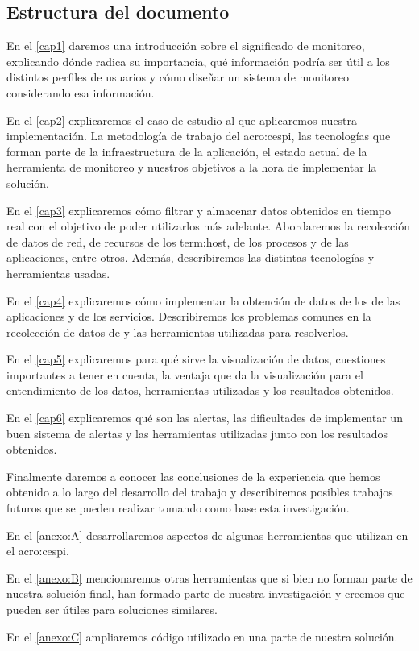 \subsection{Estructura del documento}
\label{estructura}

En el \autoref{cap1} daremos una introducción sobre el significado de
monitoreo, explicando dónde radica su importancia, qué información podría ser
útil a los distintos perfiles de usuarios y cómo diseñar un sistema de
monitoreo considerando esa información.

En el \autoref{cap2} explicaremos el caso de estudio al que aplicaremos nuestra
implementación. La metodología de trabajo del \gls{acro:cespi}, las tecnologías que
forman parte de la infraestructura de la aplicación, el estado actual de la
herramienta de monitoreo y nuestros objetivos a la hora de implementar la
solución.

En el \autoref{cap3} explicaremos cómo filtrar y almacenar datos obtenidos en
tiempo real con el objetivo de poder utilizarlos más adelante. Abordaremos la
recolección de datos de red, de recursos de los \gls{term:host}, de los
procesos y de las aplicaciones, entre otros. Además, describiremos las
distintas tecnologías y herramientas usadas.

En el \autoref{cap4} explicaremos cómo implementar la obtención de datos de los
 de las aplicaciones y de los servicios. Describiremos los problemas
comunes en la recolección de datos de  y las herramientas utilizadas
para resolverlos.

En el \autoref{cap5} explicaremos para qué sirve la visualización de datos,
cuestiones importantes a tener en cuenta, la ventaja que da la visualización
para el entendimiento de los datos, herramientas utilizadas y los resultados
obtenidos.

En el \autoref{cap6} explicaremos qué son las alertas, las dificultades de
implementar un buen sistema de alertas y las herramientas utilizadas junto con
los resultados obtenidos.

Finalmente daremos a conocer las conclusiones de la experiencia que hemos
obtenido a lo largo del desarrollo del trabajo y describiremos posibles
trabajos futuros que se pueden realizar tomando como base esta investigación.

En el \autoref{anexo:A} desarrollaremos aspectos de algunas herramientas que
utilizan en el \gls{acro:cespi}.

En el \autoref{anexo:B} mencionaremos otras herramientas que si bien no forman
parte de nuestra solución final, han formado parte de nuestra investigación y
creemos que pueden ser útiles para soluciones similares.

En el \autoref{anexo:C} ampliaremos código utilizado en una parte de nuestra
solución.
